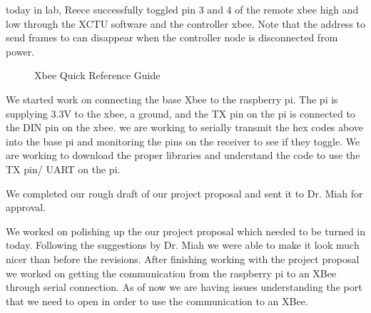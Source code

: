 \documentclass[fontsize=11pt, %
                             paper=letter, %
                             twoside, %
                             captions=tableheading,
                             index=totoc,
                             hyperref]{labbook}
\begin{document}
today in lab, Reece successfully toggled pin 3 and 4 of the remote xbee high and low through the XCTU software and the controller xbee. Note that the address to send frames to can disappear when the controller node is disconnected from power.  
\begin{figure}
  
  \caption{Xbee Quick Reference Guide}
  \label{fig:XBee Quick Reference Guide}
\end{figure}

We started work on connecting the base Xbee to the raspberry pi. The pi is supplying 3.3V to the xbee, a ground, and the TX pin on the pi is connected to the DIN pin on the xbee. we are working to serially transmit the hex codes above into the base pi and monitoring the pins on the receiver to see if they toggle. We are working to download the proper libraries and understand the code to use the TX pin/ UART on the pi. 

We completed our rough draft of our project proposal and sent it to Dr. Miah for approval. 

We worked on polishing up the our project proposal which needed to be turned in today. Following the suggestions by Dr. Miah we were able to make it look much nicer than before the revisions. After finishing working with the project proposal we worked on getting the communication from the raspberry pi to an XBee through serial connection. As of now we are having issues understanding the port that we need to open in order to use the communication to an XBee. 
\end{document}
